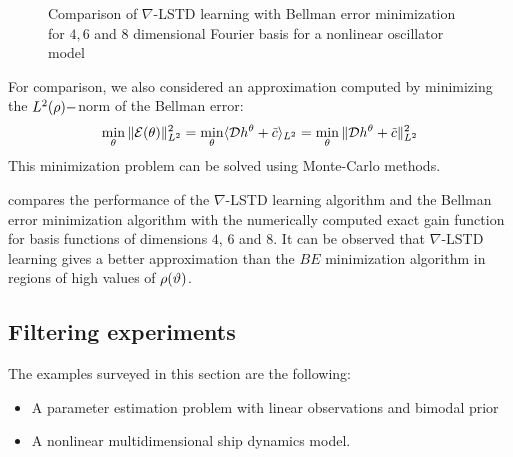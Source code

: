 \begin{figure}
	\caption{Comparison of $\nabla$-LSTD learning with Bellman error minimization for $4,6$ and $8$ dimensional Fourier basis for a nonlinear oscillator model}
	\label{fig:gain_nl_oscillator}
\end{figure}

For comparison, we also considered an approximation computed by minimizing the $L^2(\rho)-$norm of the Bellman error:
\begin{align}
\min_{\param}\|\clE(\param)\|_{L^2}^{2}=\min_{\param}\langle \clD h^\param + \tilc \rangle_{L^2} = \min_{\param}\|\clD h^\param +\tilc \|_{L^2}^{2}
\label{e:fpf_nl_be}
\end{align}
This minimization problem can be solved using Monte-Carlo methods.

 compares the performance of the $\nabla$-LSTD learning algorithm and the Bellman error minimization algorithm with the numerically computed exact gain function for basis functions of dimensions $4$, $6$ and $8$. It can be observed that $\nabla$-LSTD learning gives a better approximation than the $BE$ minimization algorithm in regions of high values of $\rho(\vartheta)$.

\subsection{Filtering experiments}
\label{s:filtering_experiments}
The examples surveyed in this section are the following:
\begin{itemize}
	\item A parameter estimation problem with linear observations and bimodal prior
	\item A nonlinear multidimensional ship dynamics model.
\end{itemize}
